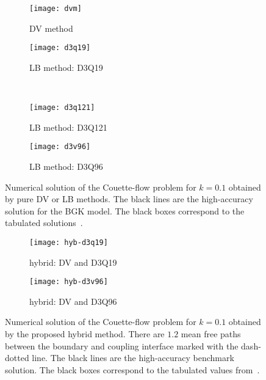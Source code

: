 \documentclass{elsarticle} %
\begin{document}
\begin{figure}
    \centering
    \begin{subfigure}[b]{0.5\textwidth}
        \texttt{[image: dvm]}
        \caption{DV method}
        \label{fig:dvm}
    \end{subfigure}%
    \begin{subfigure}[b]{0.5\textwidth}
        \texttt{[image: d3q19]}
        \caption{LB method: D3Q19}
        \label{fig:d3q19}
    \end{subfigure}\\
    \begin{subfigure}[b]{0.5\textwidth}
        \texttt{[image: d3q121]}
        \caption{LB method: D3Q121}
        \label{fig:d3q121}
    \end{subfigure}%
    \begin{subfigure}[b]{0.5\textwidth}
        \texttt{[image: d3v96]}
        \caption{LB method: D3Q96}
        \label{fig:d3q96}
    \end{subfigure}
    \caption{
        Numerical solution of the Couette-flow problem for \(k=0.1\) obtained by pure DV or LB methods.
        The black lines are the high-accuracy solution for the BGK model.
        The black boxes correspond to the tabulated solutions~\cite{Luo2016}.
    }\label{fig:pure}
\end{figure}

\begin{figure}
    \centering
    \begin{subfigure}[b]{0.5\textwidth}
        \texttt{[image: hyb-d3q19]}
        \caption{hybrid: DV and D3Q19}
        \label{fig:hyb:d3q19}
    \end{subfigure}%
    \begin{subfigure}[b]{0.5\textwidth}
        \texttt{[image: hyb-d3v96]}
        \caption{hybrid: DV and D3Q96}
        \label{fig:hyb:d3v96}
    \end{subfigure}
    \caption{
        Numerical solution of the Couette-flow problem for \(k=0.1\) obtained by the proposed hybrid method.
        There are \(1.2\) mean free paths between the boundary and coupling interface marked with the dash-dotted line.
        The black lines are the high-accuracy benchmark solution.
        The black boxes correspond to the tabulated values from~\cite{Luo2016}.
    }\label{fig:hybrid}
\end{figure}
\end{document}
